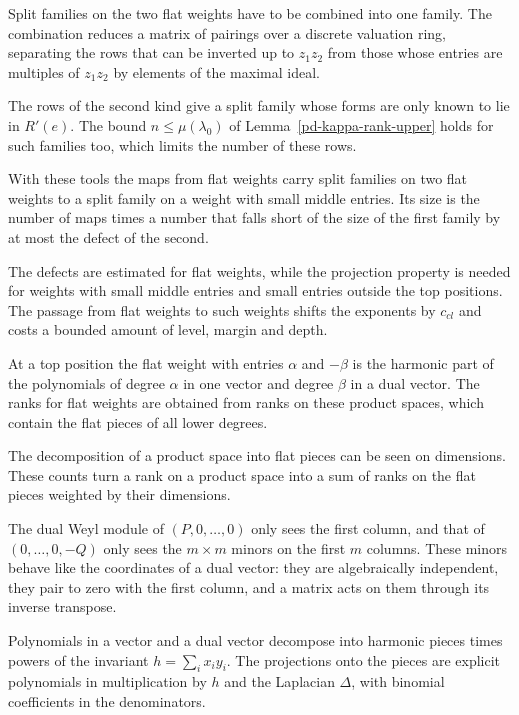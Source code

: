 Split families on the two flat weights have to be combined into one family. The combination
reduces a matrix of pairings over a discrete valuation ring, separating the rows that can be
inverted up to $z_1z_2$ from those whose entries are multiples of $z_1z_2$ by elements of the
maximal ideal.

The rows of the second kind give a split family whose forms are only known to lie in $R'(e)$. The
bound $n\leq\mu(\lambda_0)$ of Lemma~\ref{pd-kappa-rank-upper} holds for such families too, which
limits the number of these rows.

With these tools the maps from flat weights carry split families on two flat weights to a split
family on a weight with small middle entries. Its size is the number of maps times a number that
falls short of the size of the first family by at most the defect of the second.

The defects are estimated for flat weights, while the projection property is needed for weights
with small middle entries and small entries outside the top positions. The passage from flat
weights to such weights shifts the exponents by $c_{cl}$ and costs a bounded amount of level,
margin and depth.

At a top position the flat weight with entries $\alpha$ and $-\beta$ is the harmonic part of the
polynomials of degree $\alpha$ in one vector and degree $\beta$ in a dual vector. The ranks for flat
weights are obtained from ranks on these product spaces, which contain the flat pieces of all
lower degrees.

The decomposition of a product space into flat pieces can be seen on dimensions. These counts turn a
rank on a product space into a sum of ranks on the flat pieces weighted by their dimensions.

The dual Weyl module of $(P,0,\dots,0)$ only sees the first column, and that of $(0,\dots,0,-Q)$ only
sees the $m\times m$ minors on the first $m$ columns. These minors behave like the coordinates of a
dual vector: they are algebraically independent, they pair to zero with the first column, and a
matrix acts on them through its inverse transpose.

Polynomials in a vector and a dual vector decompose into harmonic pieces times powers of the invariant
$h=\sum_ix_iy_i$. The projections onto the pieces are explicit polynomials in multiplication by $h$
and the Laplacian $\Delta$, with binomial coefficients in the denominators.

